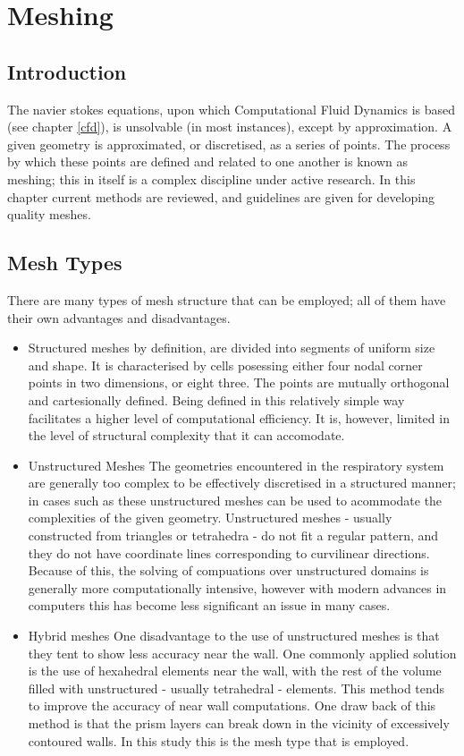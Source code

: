 \section{Meshing}
\subsection{Introduction}

The navier stokes equations, upon which Computational Fluid Dynamics is based (see chapter \ref{cfd}), is unsolvable (in most instances), except by approximation. A given geometry is approximated, or discretised, as a series of points. The process by which these points are defined and related to one another is known as meshing; this in itself is a complex discipline under active research. In this chapter current methods are reviewed, and guidelines are given for developing quality meshes.

\subsection{Mesh Types} \label{mtypes}

There are many types of mesh structure that can be employed; all of them have their own advantages and disadvantages. 

\begin{itemize}
  \item{Structured meshes} 
    by definition, are divided into segments of uniform size and shape. It is characterised by cells posessing either four nodal corner points in two dimensions, or eight three. The points are mutually orthogonal and cartesionally defined. Being defined in this relatively simple way facilitates a higher level of computational efficiency. It is, however, limited in the level of structural complexity that it can accomodate.

  \item{Unstructured Meshes}
    The geometries encountered in the respiratory system are generally too complex to be effectively discretised in a structured manner; in cases such as these unstructured meshes can be used to acommodate the complexities of the given geometry. Unstructured meshes - usually constructed from triangles or tetrahedra - do not fit a regular pattern, and they do not have coordinate lines corresponding to curvilinear directions. Because of this, the solving of compuations over unstructured domains is generally more computationally intensive, however with modern advances in computers this has become less significant an issue in many cases.

  \item{Hybrid meshes}
    One disadvantage to the use of unstructured meshes is that they tent to show less accuracy near the wall. One commonly applied solution is the use of hexahedral elements near the wall, with the rest of the volume filled with unstructured - usually tetrahedral - elements. This method tends to improve the accuracy of near wall computations. One draw back of this method is that the prism layers can break down in the vicinity of excessively contoured walls. In this study this is the mesh type that is employed.

\end{itemize}

